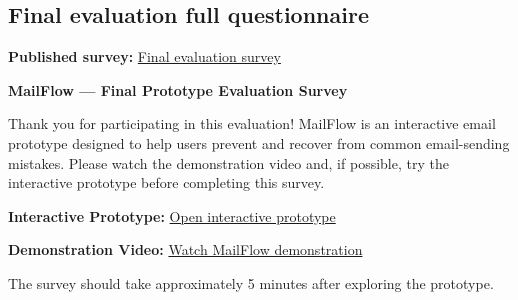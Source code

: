 \documentclass[letterpaper]{jdf}
\begin{document}
\subsection{Final evaluation full questionnaire}\label{app:final-evaluation-questions}
\textbf{Published survey:} \href{https://forms.cloud.microsoft/Pages/ResponsePage.aspx?id=u5ghSHuuJUuLem1_Mvqgg7vYf6y_H89LjQflMz5FAJxUMU1XRTg2VjhWTFM1MEtaUVUySEZWWUxEMC4u}{Final evaluation survey}

\textbf{MailFlow --- Final Prototype Evaluation Survey}

Thank you for participating in this evaluation! MailFlow is an interactive email prototype designed to help users prevent and recover from common email-sending mistakes. Please watch the demonstration video and, if possible, try the interactive prototype before completing this survey.

\textbf{Interactive Prototype:} \href{https://zihanzheng2000.github.io/mailflow_prototype/}{Open interactive prototype}

\textbf{Demonstration Video:} \href{https://gtvault-my.sharepoint.com/:v:/g/personal/zzheng399_gatech_edu/IQCoDjijGlvxSLOoSAevYqpdAXLGodNvVcylA2DDLUJvwW8}{Watch MailFlow demonstration}

The survey should take approximately 5 minutes after exploring the prototype.
\end{document}
